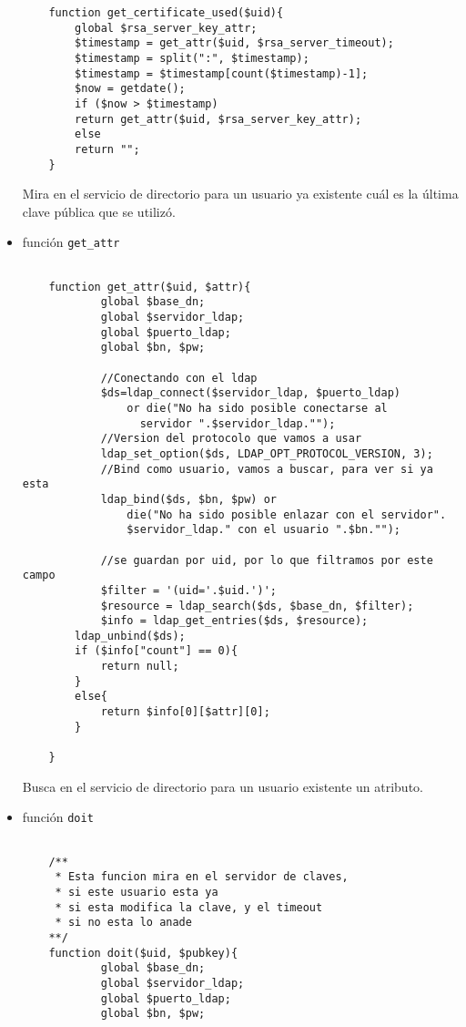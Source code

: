 \begin{itemize}
\begin{lstlisting}
    function get_certificate_used($uid){
        global $rsa_server_key_attr;
        $timestamp = get_attr($uid, $rsa_server_timeout);
        $timestamp = split(":", $timestamp);
        $timestamp = $timestamp[count($timestamp)-1];
        $now = getdate();
        if ($now > $timestamp)
        return get_attr($uid, $rsa_server_key_attr);
        else
        return "";
    }

    \end{lstlisting}

    Mira en el servicio de directorio para un usuario ya existente cuál es
    la última clave pública que se utilizó.

    \item función \texttt{get\_attr}
    \begin{lstlisting}

    function get_attr($uid, $attr){
            global $base_dn;
            global $servidor_ldap;
            global $puerto_ldap;
            global $bn, $pw;

            //Conectando con el ldap
            $ds=ldap_connect($servidor_ldap, $puerto_ldap)
                or die("No ha sido posible conectarse al
                  servidor ".$servidor_ldap."");
            //Version del protocolo que vamos a usar
            ldap_set_option($ds, LDAP_OPT_PROTOCOL_VERSION, 3);
            //Bind como usuario, vamos a buscar, para ver si ya esta
            ldap_bind($ds, $bn, $pw) or
                die("No ha sido posible enlazar con el servidor".
                $servidor_ldap." con el usuario ".$bn."");

            //se guardan por uid, por lo que filtramos por este campo
            $filter = '(uid='.$uid.')';
            $resource = ldap_search($ds, $base_dn, $filter);
            $info = ldap_get_entries($ds, $resource);
        ldap_unbind($ds);
        if ($info["count"] == 0){
            return null;
        }
        else{
            return $info[0][$attr][0];
        }

    }
    \end{lstlisting}

    Busca en el servicio de directorio para un usuario existente un
    atributo.

    \item función \texttt{doit}
    \begin{lstlisting}

    /**
     * Esta funcion mira en el servidor de claves,
     * si este usuario esta ya
     * si esta modifica la clave, y el timeout
     * si no esta lo anade
    **/
    function doit($uid, $pubkey){
            global $base_dn;
            global $servidor_ldap;
            global $puerto_ldap;
            global $bn, $pw;


\end{lstlisting}
\end{itemize}

